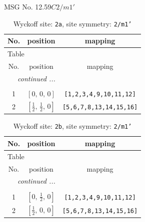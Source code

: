 \documentclass[fleqn,8pt]{jsarticle}
\begin{document}
\setcounter{MaxMatrixCols}{32}

\renewcommand{\tablename}{Table~}
\renewcommand{\figurename}{Figure~}
\begin{center}
\LARGE
MSG No. 12.59\quad$C2/m1'$
\end{center}
\renewcommand{\arraystretch}{1.2}
\begin{longtable}{ccc}
\caption{Wyckoff site: {\tt 2a}, site symmetry: {\tt 2/m1'}}
 \\
 \hline \hline
No. & position & mapping \\ \hline \endfirsthead

\multicolumn{2}{l}{\tablename\ \thetable{}} \\
 \hline \hline
No. & position & mapping \\ \hline \endhead

 \hline \hline
\multicolumn{2}{r}{\footnotesize\it continued ...} \\ \endfoot

 \hline \hline
\multicolumn{2}{r}{} \\ \endlastfoot

1 & $\left[ 0,\, 0,\, 0 \right]$ & {\tt [1,2,3,4,9,10,11,12]} \\ \hline
2 & $\left[ \frac{1}{2},\, \frac{1}{2},\, 0 \right]$ & {\tt [5,6,7,8,13,14,15,16]} \\
\end{longtable}
\renewcommand{\arraystretch}{1.2}
\begin{longtable}{ccc}
\caption{Wyckoff site: {\tt 2b}, site symmetry: {\tt 2/m1'}}
 \\
 \hline \hline
No. & position & mapping \\ \hline \endfirsthead

\multicolumn{2}{l}{\tablename\ \thetable{}} \\
 \hline \hline
No. & position & mapping \\ \hline \endhead

 \hline \hline
\multicolumn{2}{r}{\footnotesize\it continued ...} \\ \endfoot

 \hline \hline
\multicolumn{2}{r}{} \\ \endlastfoot

1 & $\left[ 0,\, \frac{1}{2},\, 0 \right]$ & {\tt [1,2,3,4,9,10,11,12]} \\ \hline
2 & $\left[ \frac{1}{2},\, 0,\, 0 \right]$ & {\tt [5,6,7,8,13,14,15,16]} \\
\end{longtable}
\end{document}
